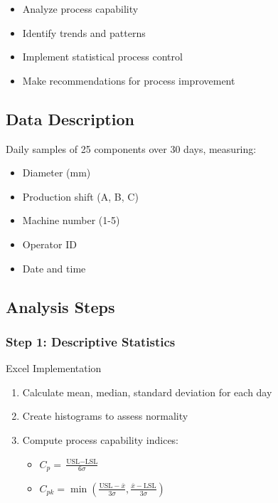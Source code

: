 \documentclass[12pt,a4paper]{book}
\begin{document}
{{\begin{itemize}
    \item Analyze process capability
    \item Identify trends and patterns
    \item Implement statistical process control
    \item Make recommendations for process improvement
\end{itemize}

\subsection{Data Description}

Daily samples of 25 components over 30 days, measuring:
\begin{itemize}
    \item Diameter (mm)
    \item Production shift (A, B, C)
    \item Machine number (1-5)
    \item Operator ID
    \item Date and time
\end{itemize}

\subsection{Analysis Steps}

\subsubsection{Step 1: Descriptive Statistics}

\begin{example}{Excel Implementation}
\begin{enumerate}
    \item Calculate mean, median, standard deviation for each day
    \item Create histograms to assess normality
    \item Compute process capability indices:
    \begin{itemize}
        \item $C_p = \frac{\text{USL} - \text{LSL}}{6\sigma}$
        \item $C_{pk} = \min\left(\frac{\text{USL} - \bar{x}}{3\sigma}, \frac{\bar{x} - \text{LSL}}{3\sigma}\right)$
    \end{itemize}
\end{enumerate}
\end{example}

}}
\end{document}
